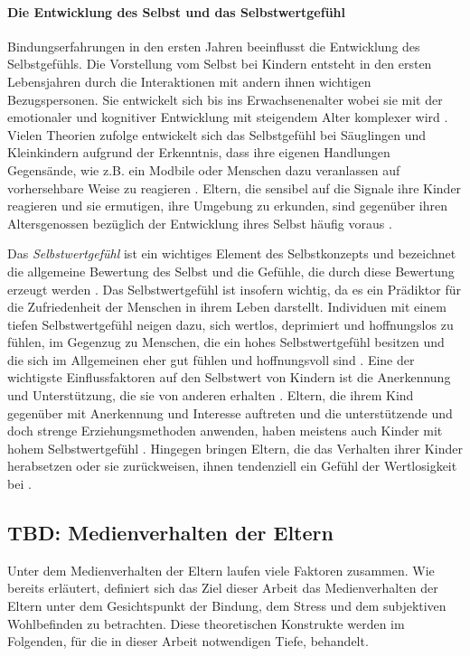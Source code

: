\paragraph{Die Entwicklung des Selbst und das Selbstwertgefühl}\label{par:EntwSelbst}
Bindungserfahrungen in den ersten Jahren beeinflusst die Entwicklung des Selbstgefühls. Die Vorstellung vom Selbst bei Kindern entsteht in den ersten Lebensjahren durch die Interaktionen mit andern ihnen wichtigen Bezugspersonen. Sie entwickelt sich bis ins Erwachsenenalter wobei sie mit der emotionaler und kognitiver Entwicklung mit steigendem Alter komplexer wird \cite[S.~602ff]{Siegler2008}. Vielen Theorien zufolge entwickelt sich das Selbstgefühl bei Säuglingen und Kleinkindern aufgrund der Erkenntnis, dass ihre eigenen Handlungen Gegensände, wie z.B. ein Modbile oder Menschen dazu veranlassen auf vorhersehbare Weise zu reagieren \cite{Harter1998}. Eltern, die sensibel auf die Signale ihre Kinder reagieren und sie ermutigen, ihre Umgebung zu erkunden, sind gegenüber ihren Altersgenossen bezüglich der Entwicklung ihres Selbst häufig voraus \cite{Pipp1992}. 

Das \textit{Selbstwertgefühl} ist ein wichtiges Element des Selbstkonzepts und bezeichnet die allgemeine Bewertung des Selbst und die Gefühle, die durch diese Bewertung erzeugt werden \cite{Crocker2001}. Das Selbstwertgefühl ist insofern wichtig, da es ein Prädiktor für die Zufriedenheit der Menschen in ihrem Leben darstellt. Individuen mit einem tiefen Selbstwertgefühl neigen dazu, sich wertlos, deprimiert und hoffnungslos zu fühlen, im Gegenzug zu Menschen, die ein hohes Selbstwertgefühl besitzen und die sich im Allgemeinen eher gut fühlen und hoffnungsvoll sind \cite{Harter1999}. Eine der wichtigste Einflussfaktoren auf den Selbstwert von Kindern ist die Anerkennung und Unterstützung, die sie von anderen erhalten \cite{Siegler2008}. Eltern, die ihrem Kind gegenüber mit Anerkennung und Interesse auftreten und die unterstützende und doch strenge Erziehungsmethoden anwenden, haben meistens auch Kinder mit hohem Selbstwertgefühl \cite{Feiring1996}. Hingegen bringen Eltern, die das Verhalten ihrer Kinder herabsetzen oder sie zurückweisen, ihnen tendenziell ein Gefühl der Wertlosigkeit bei \cite{Harter1999}. 

\subsection{TBD: Medienverhalten der Eltern}\label{sec:Medienverhalten}
Unter dem Medienverhalten der Eltern laufen viele Faktoren zusammen. Wie bereits erläutert, definiert sich das Ziel dieser Arbeit das Medienverhalten der Eltern unter dem Gesichtspunkt der Bindung, dem Stress und dem subjektiven Wohlbefinden zu betrachten. Diese theoretischen Konstrukte werden im Folgenden, für die in dieser Arbeit notwendigen Tiefe, behandelt.
